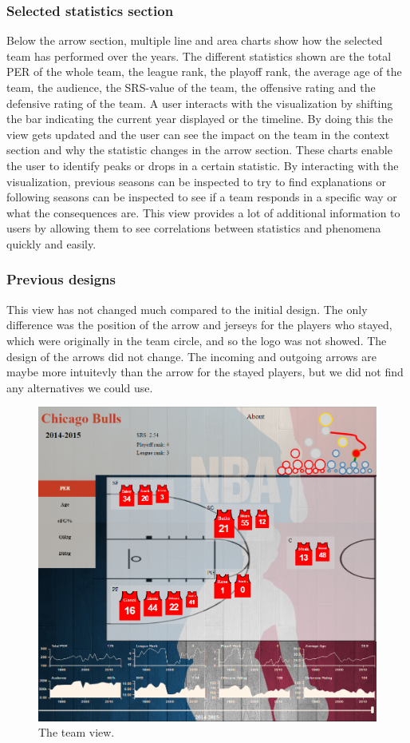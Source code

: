 \documentclass[chi_draft]{sigchi}
\begin{document}
\subsubsection{Selected statistics section}
Below the arrow section, multiple line and area charts show how the selected 
team has performed over the years. The different statistics shown are the 
total PER of the whole team, the league rank, the playoff rank, the average age 
of the team, the audience, the SRS-value of the team, the offensive rating and 
the defensive rating of the team. A user interacts with the visualization by 
shifting the bar indicating the current year displayed or the timeline. By 
doing this the view gets updated and the user can see the impact on the team 
in the context section and why the statistic changes in the arrow section. 
These charts enable the user to identify peaks or drops in a certain statistic. 
By interacting with the visualization, previous seasons can be inspected to try 
to find explanations or following seasons can be inspected to see if a team 
responds in a specific way or what the consequences are. This view provides 
a lot of additional information to users by allowing them to see correlations 
between statistics and phenomena quickly and easily.

\subsubsection{Previous designs}
This view has not changed much compared to the initial design. The only difference 
was the position of the arrow and jerseys for the players who stayed, which were 
originally in the team circle, and so the logo was not showed. 
The design of the arrows did not change. The incoming and outgoing 
arrows are maybe more intuitevly than the arrow for the stayed players, but we did 
not find any alternatives we could use.

\begin{figure}
\centering
  \includegraphics[width=1.0\columnwidth]{figures/teamview}
  \caption{The team view.}
  \label{fig:teamview}
\end{figure}
\end{document}
